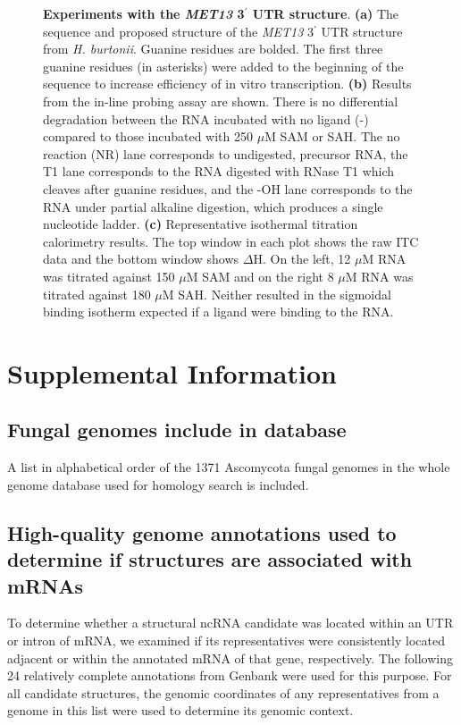 \documentclass[12pt]{report}
\begin{document}
\begin{figure}
	\caption[Experiments with the \textit{MET13} 3$^\prime$ UTR structure]{\textbf{Experiments with the \textit{MET13} 3$^\prime$ UTR structure}. \textbf{(a)} The sequence and proposed structure of the \textit{MET13} 3$^\prime$ UTR structure from \textit{H. burtonii}. Guanine residues are bolded. The first three guanine residues (in asterisks) were added to the beginning of the sequence to increase efficiency of in vitro transcription. \textbf{(b)} Results from the in-line probing assay are shown. There is no differential degradation between the RNA incubated with no ligand (-) compared to those incubated with 250 $\mu$M SAM or SAH. The no reaction (NR) lane corresponds to undigested, precursor RNA, the T1 lane corresponds to the RNA digested with RNase T1 which cleaves after guanine residues, and the -OH lane corresponds to the RNA under partial alkaline digestion, which produces a single nucleotide ladder. \textbf{(c)} Representative isothermal titration calorimetry results. The top window in each plot shows the raw ITC data and the bottom window shows $\Delta$H. On the left, 12 $\mu$M RNA was titrated against 150 $\mu$M SAM and on the right 8 $\mu$M RNA was titrated against 180 $\mu$M SAH. Neither resulted in the sigmoidal binding isotherm expected if a ligand were binding to the RNA.}
	\label{fig:S4}
\end{figure}

\newpage

\section{Supplemental Information}

\subsection{Fungal genomes include in database}

A list in alphabetical order of the 1371 Ascomycota fungal genomes in the whole genome database used for homology search is included. 

\subsection{High-quality genome annotations used to determine if structures are associated with mRNAs}

To determine whether a structural ncRNA candidate was located within an UTR or intron of mRNA, we examined if its representatives were consistently located adjacent or within the annotated mRNA of that gene, respectively. The following 24 relatively complete annotations from Genbank were used for this purpose. For all candidate structures, the genomic coordinates of any representatives from a genome in this list were used to determine its genomic context.
\end{document}
